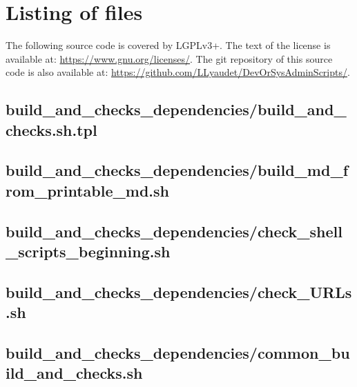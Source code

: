 \documentclass{article}
\begin{document}
\section{Listing of files}
\label{section:listing}

The following source code is covered by LGPLv3+.
The text of the license is available at:
\url{https://www.gnu.org/licenses/}.
The git repository of this source code is also available at:
\url{https://github.com/LLyaudet/DevOrSysAdminScripts/}.


\subsection{
  build\_and\_checks\_dependencies/build\_and\_checks.sh.tpl
}
\label{
  build_and_checks_dependencies:build_and_checksshtpl
}



\subsection{
  build\_and\_checks\_dependencies/build\_md\_from\_printable\_md.sh
}
\label{
  build_and_checks_dependencies:build_md_from_printable_mdsh
}



\subsection{
  build\_and\_checks\_dependencies/check\_shell\_scripts\_beginning.sh
}
\label{
  build_and_checks_dependencies:check_shell_scripts_beginningsh
}



\subsection{
  build\_and\_checks\_dependencies/check\_URLs.sh
}
\label{
  build_and_checks_dependencies:check_URLssh
}



\subsection{
  build\_and\_checks\_dependencies/common\_build\_and\_checks.sh
}
\label{
  build_and_checks_dependencies:common_build_and_checkssh
}
\end{document}
